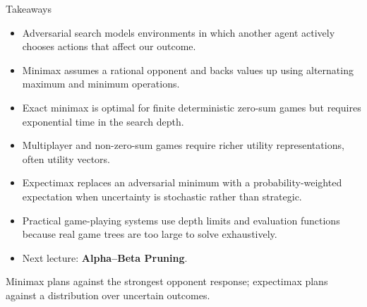 \documentclass[aspectratio=169,10pt]{beamer}
\begin{document}
\begin{frame}[shrink=18]{Takeaways}
  \begin{itemize}
    \item Adversarial search models environments in which another agent actively chooses actions that affect our outcome.
    \item Minimax assumes a rational opponent and backs values up using alternating maximum and minimum operations.
    \item Exact minimax is optimal for finite deterministic zero-sum games but requires exponential time in the search depth.
    \item Multiplayer and non-zero-sum games require richer utility representations, often utility vectors.
    \item Expectimax replaces an adversarial minimum with a probability-weighted expectation when uncertainty is stochastic rather than strategic.
    \item Practical game-playing systems use depth limits and evaluation functions because real game trees are too large to solve exhaustively.
    \item Next lecture: \textbf{Alpha--Beta Pruning}.
  \end{itemize}
  \begin{keyidea}
    Minimax plans against the strongest opponent response; expectimax plans against a distribution over uncertain outcomes.
  \end{keyidea}
\end{frame}
\end{document}
